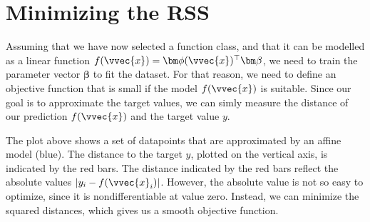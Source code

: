 \documentclass[letterpaper,10pt,english]{jupyterBook}
\begin{document}
\section{Minimizing the RSS}
\label{\detokenize{regression_optimization:minimizing-the-rss}}\label{\detokenize{regression_optimization::doc}}
\sphinxAtStartPar
Assuming that we have now selected a function class, and that it can be modelled as a linear function \(f(\vvec{x})=\bm\phi(\vvec{x})^\top\bm\beta\), we need to train the parameter vector \(\bm\beta\) to fit the dataset. For that reason, we need to define an objective function that is small if the model \(f(\vvec{x})\) is suitable. Since our goal is to approximate the target values, we can simly measure the distance of our prediction \(f(\vvec{x})\) and the target value \(y\).
\begin{center}\pgfplotsset{compat=newest}
\loadedtable
{}
\end{center}
\sphinxAtStartPar
The plot above shows a set of datapoints that are approximated by an affine model (blue). The distance to the target \(y\), plotted on the vertical axis, is indicated by the red bars. The distance indicated by the red bars reflect the absolute values \(\lvert y_i - f(\vvec{x}_i)\rvert\). However, the absolute value is not so easy to optimize, since it is non\sphinxhyphen{}differentiable at value zero. Instead, we can minimize the squared distances, which gives us a smooth objective function.
\end{document}
